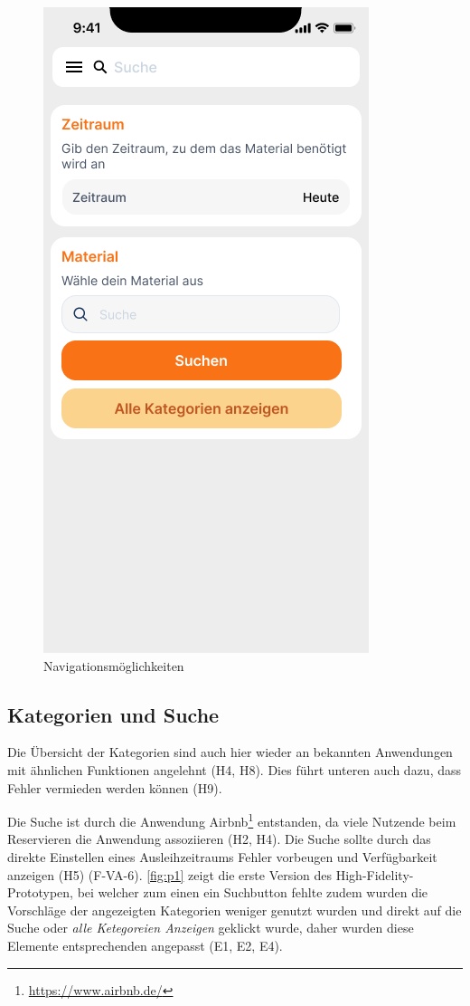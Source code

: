 \begin{figure}[h]
    \includegraphics[scale=0.4]{Bilder/Prototyp/Neu/Suche V2.png}
    \caption[-]{Navigationsmöglichkeiten}
    \label{fig:nav}
\end{figure}

\subsection{Kategorien und Suche}
Die Übersicht der Kategorien sind auch hier wieder an bekannten
Anwendungen mit ähnlichen Funktionen angelehnt (H4, H8). Dies führt unteren auch dazu, dass Fehler
vermieden werden können (H9).

Die Suche ist durch die Anwendung Airbnb\footnote{\url{https://www.airbnb.de/}} entstanden, da viele
Nutzende beim Reservieren die Anwendung assoziieren (H2, H4). Die Suche sollte durch das direkte
Einstellen eines Ausleihzeitraums Fehler vorbeugen und Verfügbarkeit anzeigen (H5) (F-VA-6).
\ref{fig:p1} zeigt die erste Version des High-Fidelity-Prototypen, bei welcher zum einen ein
Suchbutton fehlte zudem wurden die Vorschläge der angezeigten Kategorien weniger genutzt wurden und
direkt auf die Suche oder \textit{alle Ketegoreien Anzeigen} geklickt wurde, daher wurden diese
Elemente entsprechenden angepasst (E1, E2, E4).


